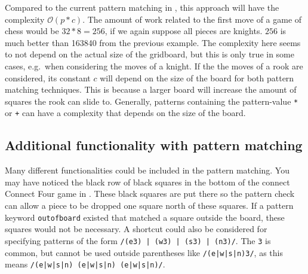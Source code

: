 Compared to the current pattern matching in \productname{}, this
approach will have the complexity $\mathcal{O}(p * c)$. The amount of
work related to the first move of a game of chess would be $32 * 8 =
256$, if we again suppose all pieces are knights. $256$ is much better
than \num{163840} from the previous example. The complexity here seems
to not depend on the actual size of the gridboard, but this is only
true in some cases, e.g.\ when considering the moves of a knight. If
the the moves of a rook are considered, its constant $c$ will depend
on the size of the board for both pattern matching techniques. This is
because a larger board will increase the amount of squares the rook can
slide to. Generally, patterns containing the pattern-value \texttt{*} or
\texttt{+} can have a complexity that depends on the size of the board.


\subsection{Additional functionality with pattern matching}
Many different functionalities could be included in the
pattern matching. You may have noticed the black row of black
squares in the bottom of the connect Connect Four game in
. These black squares are put there so the
pattern check can allow a piece to be dropped one square north of these
squares. If a pattern keyword \texttt{outofboard} existed that matched
a square outside the board, these squares would not be necessary. A
shortcut could also be considered for specifying patterns of the form
\texttt{/(e3) | (w3) | (s3) | (n3)/}. The \texttt{3} is common, but
cannot be used outside parentheses like \texttt{/(e|w|s|n)3/}, as this
means \texttt{/(e|w|s|n) (e|w|s|n) (e|w|s|n)/}.
